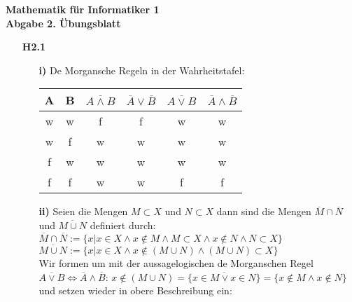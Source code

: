 \documentclass[a4paper,abstract,german]{scrreprt}
\begin{document}
\noindent
{\begin{flushright}
%
%	
\end{flushright}}
\begin{center}
	{\textbf  {Mathematik für Informatiker 1}} \\
	{\textbf {Abgabe 2. Übungsblatt}}
\end{center}\vspace{0.3cm}

%
%
\begin{enumerate}
	
	
	\item[\textbf {H2.1}]
	\begin{enumerate}
	\item[\textbf {i)}]
    	De Morgansche Regeln in der Wahrheitstafel: \\
    	\begin{center}
        \begin{tabular}{||c c | c c | c c ||}
         A & B & $\overline{A \land B}$ & $\overline{A} \lor \overline{B}$ & $\overline{A \lor B}$ & $\overline{A} \land \overline{B} $ \\
         \hline
         w & w & f & f & w & w\\
         w & f & w & w & w & w\\
         f & w & w & w & w & w\\
         f & f & w & w & f & f\\
        \end{tabular}
        \end{center}
    \item[\textbf {ii)}]
        Seien die Mengen $M \subset X$ und $N\subset X$ dann sind die Mengen $\overline{M} \cap \overline{N}$ und $\overline{M \cup N}$ definiert durch:\\
        
        $\overline{M} \cap \overline{N} := \{ x |x \in X \land x \notin M \land M \subset X \land x \notin N \land N \subset X \}$ \\
        $\overline{M \cup N} := \{x|x \in X \land x \notin (M \cup N) \land (M \cup N) \subset X\}$  \\
        
        Wir formen um mit der aussagelogischen de Morganschen Regel $\overline{A\lor B} \iff \overline{A} \land \overline{B}  $: $ {x \notin (M \cup N)} = \{\overline{x \in M \lor x \in N}\} = \{x \notin M \land x \notin N\} $ und setzen wieder in obere Beschreibung ein:\\
        

\end{enumerate}
\end{enumerate}
\end{document}
